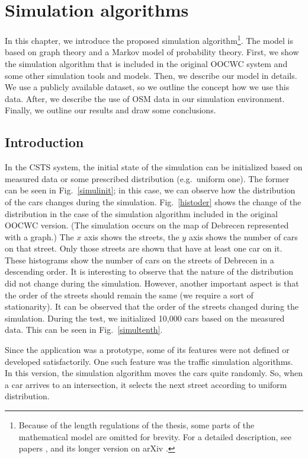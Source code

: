 \documentclass[b5paper,12pt]{report}
\theoremstyle{definition}
\begin{document}
\chapter{Simulation algorithms}
\label{simul}

In this chapter, we introduce the proposed simulation algorithm\footnote{Because of the length regulations of the thesis, some parts of the mathematical model are omitted for brevity. For a detailed description, see papers \cite{traffic-paper}, \cite{markov-traffic-paper} and its longer version on arXiv \cite{besenczi2020largescale}.}. The model is based on graph theory and a Markov model of probability theory. First, we show the simulation algorithm that is included in the original OOCWC system and some other simulation tools and models. Then, we describe our model in details. We use a publicly available dataset, so we outline the concept how we use this data. After, we describe the use of OSM data in our simulation environment. Finally, we outline our results and draw some conclusions.

\section{Introduction}
In the CSTS system, the initial state of the simulation can be initialized based on measured data or some prescribed distribution (e.g.~uniform one). The former can be seen in Fig.~\ref{simulinit}; in this case, we can observe how the distribution of the cars changes during the simulation. Fig.~\ref{histoder} shows the change of the distribution in the case of the simulation algorithm included in the original OOCWC version. (The simulation occurs on the map of Debrecen represented with a graph.) The $x$ axis shows the streets, the $y$ axis shows the number of cars on that street. Only those streets are shown that have at least one car on it. These histograms show the number of cars on the streets of Debrecen in a descending order. It is interesting to observe that the nature of the distribution did not change during the simulation. However, another important aspect is that the order of the streets should remain the same (we require a sort of stationarity). It can be observed that the order of the streets changed during the simulation. During the test, we initialized 10,000 cars based on the measured data. This can be seen in Fig.~\ref{simultenth}.

Since the application was a prototype, some of its features were not defined or developed satisfactorily. One such feature was the traffic simulation algorithms. In this version, the simulation algorithm moves the cars quite randomly. So, when a car arrives to an intersection, it selects the next street according to uniform distribution.
\end{document}
